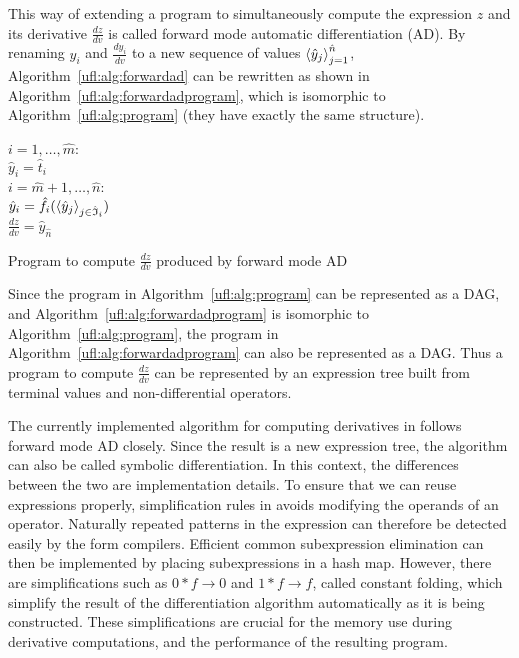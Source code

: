This way of extending a program to simultaneously compute the
expression $z$ and its derivative $\frac{d z}{d v}$ is called forward
mode automatic differentiation (AD).  By renaming $y_i$ and $\frac{d
  y_i}{d v}$ to a new sequence of values $\left\langle{\hat y_j}\right\rangle_{j=1}^{\hat
  n}$, Algorithm~\ref{ufl:alg:forwardad} can be rewritten as shown in
Algorithm~\ref{ufl:alg:forwardadprogram}, which is isomorphic to
Algorithm~\ref{ufl:alg:program} (they have exactly the same
structure).
\begin{algorithm}
\afor $i = 1, \ldots, \hat m$:\\
\tab $\hat y_i = \hat t_i$ \\
\afor $i = \hat m + 1, \ldots, \hat n$:\\
\tab $\hat y_i = \hat f_i(\left\langle{\hat y_j}\right\rangle_{j\in\hat{\mathfrak{I}}_i})$ \\
$\frac{d z}{d v} = \hat y_{\hat n}$
\caption{Program to compute $\frac{d z}{d v}$ produced by forward mode AD}
\label{ufl:alg:forwardadprogram}
\end{algorithm}

Since the program in Algorithm~\ref{ufl:alg:program} can be
represented as a DAG, and Algorithm~\ref{ufl:alg:forwardadprogram} is
isomorphic to Algorithm~\ref{ufl:alg:program}, the program in
Algorithm~\ref{ufl:alg:forwardadprogram} can also be represented as a
DAG.  Thus a program to compute $\frac{d z}{d v}$ can be represented
by an expression tree built from terminal values and non-differential
operators.

The currently implemented algorithm for computing derivatives in
\ufl{} follows forward mode AD closely. Since the result is a new
expression tree, the algorithm can also be called symbolic
differentiation. In this context, the differences between the two are
implementation details.  To ensure that we can reuse expressions
properly, simplification rules in \ufl{} avoids modifying the operands
of an operator.  Naturally repeated patterns in the expression can
therefore be detected easily by the form compilers.  Efficient common
subexpression elimination can then be implemented by placing
subexpressions in a hash map.  However, there are simplifications such
as $0*f\rightarrow 0$ and $1*f\rightarrow f$, called constant folding,
which simplify the result of the differentiation algorithm automatically
as it is being constructed.  These simplifications are crucial for the
memory use during derivative computations, and the performance of the
resulting program.

